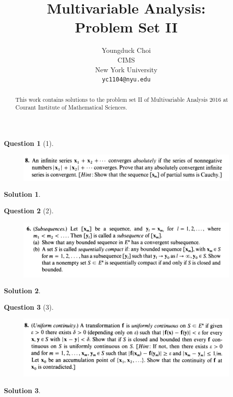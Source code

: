 \documentclass{article} %
\title{Multivariable Analysis:  \\
Problem Set II}
\author{
Youngduck Choi \\
CIMS \\
New York University\\
\texttt{yc1104@nyu.edu} \\
}
\theoremstyle{quest}
\newtheorem*{question}{Question}
\newtheorem*{solution}{Solution}
\begin{document}
\maketitle

\begin{abstract}
This work contains solutions to the problem set II
of Multivariable Analysis 2016 at Courant Institute of Mathematical Sciences.
\end{abstract}

\bigskip

\begin{question}[1]
\hfill
\begin{figure}[h!]
  \centering
    \includegraphics[width=1\textwidth]{MA-2-23-8.png}
\end{figure}
\end{question}
\begin{solution}
\end{solution}

\newpage

\begin{question}[2]
\hfill
\begin{figure}[h!]
  \centering
    \includegraphics[width=1\textwidth]{MA-2-24-6.png}
\end{figure}
\end{question}
\begin{solution}
\end{solution}

\newpage

\begin{question}[3]
\hfill
\begin{figure}[h!]
  \centering
    \includegraphics[width=1\textwidth]{MA-2-25-8.png}
\end{figure}
\end{question}
\begin{solution}

\end{solution}
\end{document}
